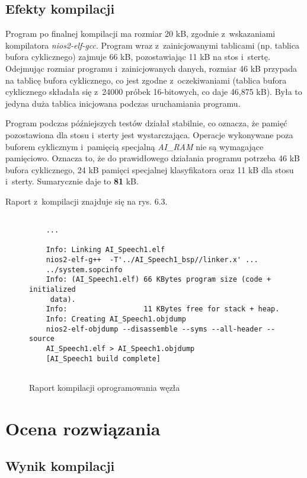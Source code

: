 \subsection{Efekty kompilacji}

Program po finalnej kompilacji ma rozmiar 20 kB, zgodnie z~wskazaniami kompilatora \textit{nios2-elf-gcc}. Program wraz z~zainicjowanymi tablicami (np. tablica bufora cyklicznego) zajmuje 66 kB, pozostawiając 11 kB na stos i~stertę. Odejmując rozmiar programu i~zainicjowanych danych, rozmiar 46 kB przypada na tablicę bufora cyklicznego, co jest zgodne z~oczekiwaniami (tablica bufora cyklicznego składała się z~24000 próbek 16-bitowych, co daje 46,875 kB). Była to jedyna duża tablica inicjowana podczas uruchamiania programu.

Program podczas późniejszych testów działał stabilnie, co oznacza, że pamięć pozostawiona dla stosu i~sterty jest wystarczająca. Operacje wykonywane poza buforem cyklicznym i~pamięcią specjalną \textit{AI\_RAM} nie są wymagające pamięciowo. Oznacza to, że do prawidłowego działania programu potrzeba 46 kB bufora cyklicznego, 24 kB pamięci specjalnej klasyfikatora oraz 11 kB dla stosu i~sterty. Sumarycznie daje to \textbf{81} kB.

Raport z~kompilacji znajduje się na rys. 6.3.

\begin{figure}[h]
\begin{lstlisting}
	
	...
	
	Info: Linking AI_Speech1.elf
	nios2-elf-g++  -T'../AI_Speech1_bsp//linker.x' ...
	../system.sopcinfo
	Info: (AI_Speech1.elf) 66 KBytes program size (code + initialized
	 data).
	Info:                  11 KBytes free for stack + heap.
	Info: Creating AI_Speech1.objdump
	nios2-elf-objdump --disassemble --syms --all-header --source 
	AI_Speech1.elf > AI_Speech1.objdump
	[AI_Speech1 build complete]
	
\end{lstlisting}
	\caption{Raport kompilacji oprogramowania węzła}
\end{figure}
\FloatBarrier %

\newpage
\section{Ocena rozwiązania}

\subsection{Wynik kompilacji}

